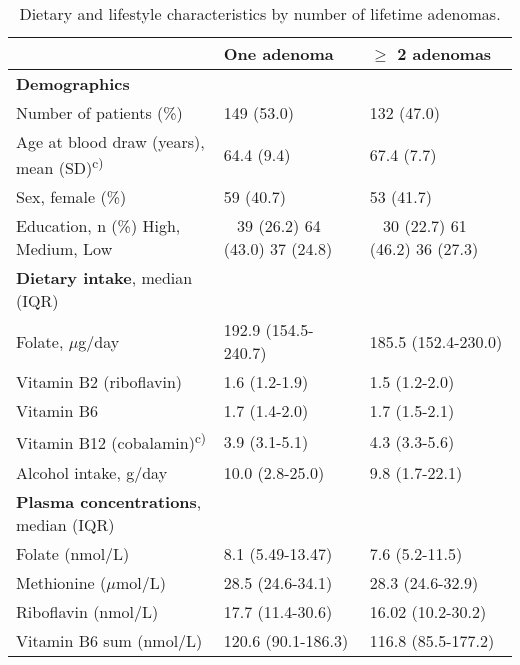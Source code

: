 \begin{table}
\small
\caption{Dietary and lifestyle characteristics by number of lifetime adenomas.}
\label{table5_1}
\begin{adjustbox}{width=\textwidth}
\begin{tabular}{L{5.5cm}L{3.5cm}L{3cm}}

\hline ~ & \bfseries\color{black} One adenoma & \bfseries\color{black} ${\geq}$ 2
adenomas\\
\hline
\bfseries Demographics & ~ & ~ \\

 Number of patients (\%) & 149 (53.0) & 132 (47.0)\\
 Age at blood draw (years), mean (SD)\textsuperscript{c)} & 64.4 (9.4) & 67.4 (7.7)\\
 Sex, female (\%) & 59 (40.7) & 53 (41.7)\\
{Education, n (\%)}{ High,}{ Medium,} Low & ~ { 39 (26.2)}{ 64 (43.0)} 37 (24.8) & ~ { 30 (22.7)}{ 61 (46.2)} 36 (27.3)\\

 \textbf{Dietary intake}, median (IQR) & ~ & ~ \\

 Folate, \textrm{${\mu}$}g/day & 192.9 (154.5-240.7) & 185.5 (152.4-230.0)\\

 Vitamin B2 (riboflavin) & 1.6 (1.2-1.9) & 1.5 (1.2-2.0)\\

 Vitamin B6 & 1.7 (1.4-2.0) & 1.7 (1.5-2.1)\\

 Vitamin B12
(cobalamin)\textsuperscript{c)} & 3.9 (3.1-5.1) & 4.3 (3.3-5.6)\\

 Alcohol intake, g/day & 10.0 (2.8-25.0) & 9.8 (1.7-22.1)\\

 \textbf{Plasma concentrations}, median (IQR) & ~ & ~ \\

 Folate (nmol/L) & 8.1 (5.49-13.47) & 7.6 (5.2-11.5)\\

 Methionine (\textrm{${\mu}$}mol/L) & 28.5 (24.6-34.1) & 28.3 (24.6-32.9)\\

 Riboflavin (nmol/L) & 17.7 (11.4-30.6) & 16.02 (10.2-30.2)\\

 Vitamin B6 sum (nmol/L) & 120.6 (90.1-186.3) & 116.8 (85.5-177.2)\\


\end{tabular}
\end{adjustbox}
\end{table}
